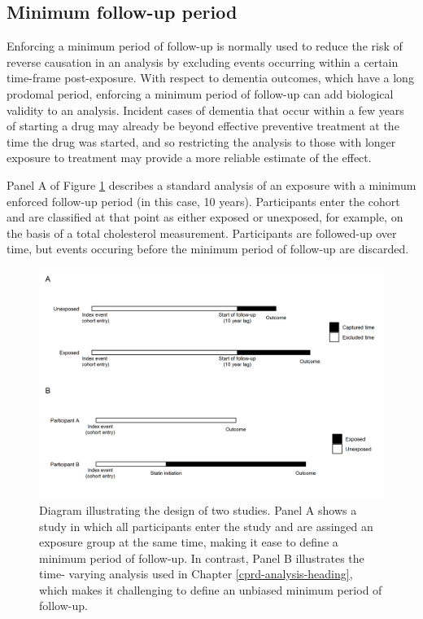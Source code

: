\documentclass[a4paper, twoside]{templates/ociamthesis}
\begin{document}
\hypertarget{cprd-min-fu}{%
\subsection{Minimum follow-up period}\label{cprd-min-fu}}

Enforcing a minimum period of follow-up is normally used to reduce the risk of reverse causation in an analysis by excluding events occurring within a certain time-frame post-exposure. With respect to dementia outcomes, which have a long prodomal period, enforcing a minimum period of follow-up can add biological validity to an analysis. Incident cases of dementia that occur within a few years of starting a drug may already be beyond effective preventive treatment at the time the drug was started, and so restricting the analysis to those with longer exposure to treatment may provide a more reliable estimate of the effect.

Panel A of Figure \ref{fig:minFU} describes a standard analysis of an exposure with a minimum enforced follow-up period (in this case, 10 years). Participants enter the cohort and are classified at that point as either exposed or unexposed, for example, on the basis of a total cholesterol measurement. Participants are followed-up over time, but events occuring before the minimum period of follow-up are discarded.





\begin{figure}[H]
\includegraphics[width=1\linewidth]{figures/appendix/minFU} \caption[Illustration of minimum follow-up period in two study designs]{Diagram illustrating the design of two studies. Panel A shows a study in which all participants enter the study and are assinged an exposure group at the same time, making it ease to define a minimum period of follow-up. In contrast, Panel B illustrates the time- varying analysis used in Chapter \ref{cprd-analysis-heading}, which makes it challenging to define an unbiased minimum period of follow-up.}\label{fig:minFU}
\end{figure}
\end{document}
